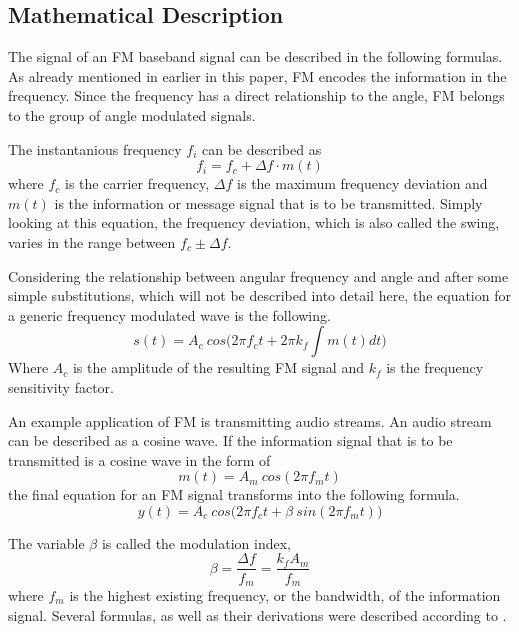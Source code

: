 \documentclass[conference]{IEEEtran}
\begin{document}
  \subsection{Mathematical Description}
    The signal of an FM baseband signal can be described in the following formulas.
    As already mentioned in earlier in this paper, FM encodes the information in the frequency.
    Since the frequency has a direct relationship to the angle, FM belongs to the group of angle modulated signals.

    The instantanious frequency $f_i$ can be described as
    \begin{equation}
      f_i = f_c + \Delta f \cdot m(t)
    \end{equation}
    where $f_c$ is the carrier frequency, $\Delta f$ is the maximum frequency deviation and $m(t)$ is the information or message signal that is to be transmitted.
    Simply looking at this equation, the frequency deviation, which is also called the swing, varies in the range between $f_c \pm \Delta f$.

    Considering the relationship between angular frequency and angle and after some simple substitutions, which will not be described into detail here, the equation for a generic frequency modulated wave is the following.
    \begin{equation}
      s(t) = A_c\ cos \Big( 2 \pi f_c t + 2 \pi k_f \int m(t) dt \Big)
      \label{equ_fm_func}
    \end{equation}
    Where $A_c$ is the amplitude of the resulting FM signal and $k_f$ is the frequency sensitivity factor.

    An example application of FM is transmitting audio streams.
    An audio stream can be described as a cosine wave.
    If the information signal that is to be transmitted is a cosine wave in the form of
    \begin{equation}
      m(t) = A_m\ cos(2 \pi f_m t)
    \end{equation}
    the final equation for an FM signal transforms into the following formula.
    \begin{equation}
      y(t) = A_c\ cos \Big(2 \pi f_c t + \beta\ sin(2 \pi f_m t)\Big )
    \end{equation}

    The variable $\beta$ is called the modulation index,
    \begin{equation}
      \beta = \frac{\Delta f}{f_m} = \frac{k_f A_m}{f_m}
    \end{equation}
    where $f_m$ is the highest existing frequency, or the bandwidth, of the information signal.
    Several formulas, as well as their derivations were described according to \cite{FM_Maths_Info_1}\cite{FMMaths2}.
\end{document}
